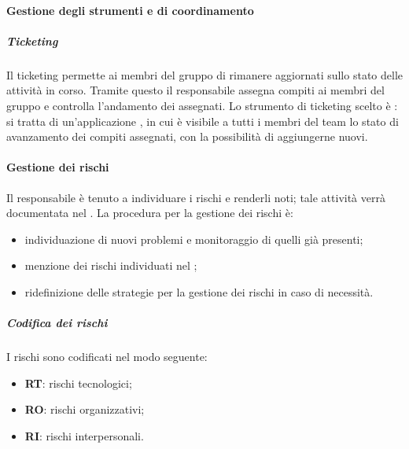 \paragraph{Gestione degli strumenti e di coordinamento}
\subparagraph{Ticketing}
Il ticketing permette ai membri del gruppo di rimanere aggiornati sullo stato delle attività in corso. Tramite questo il responsabile assegna compiti ai membri del gruppo e controlla l'andamento dei  assegnati. Lo strumento di ticketing scelto è : si tratta di un'applicazione , in cui è visibile a tutti i membri del team lo stato di avanzamento dei compiti assegnati, con la possibilità di aggiungerne nuovi. 

\paragraph{Gestione dei rischi}
Il responsabile è tenuto a individuare i rischi e renderli noti; tale attività verrà documentata nel \PdP{}. La procedura per la gestione dei rischi è: 
\begin{itemize}
\item individuazione di nuovi problemi e monitoraggio di quelli già presenti;
\item menzione dei rischi individuati nel \PdP{}; 
\item ridefinizione delle strategie per la gestione dei rischi in caso di necessità.
\end{itemize}

\subparagraph{Codifica dei rischi}
I rischi sono codificati nel modo seguente: 
\begin{itemize}
\item  \textbf{RT}: rischi tecnologici; 
\item \textbf{RO}: rischi organizzativi;
\item   \textbf{RI}: rischi interpersonali.
\end{itemize}

